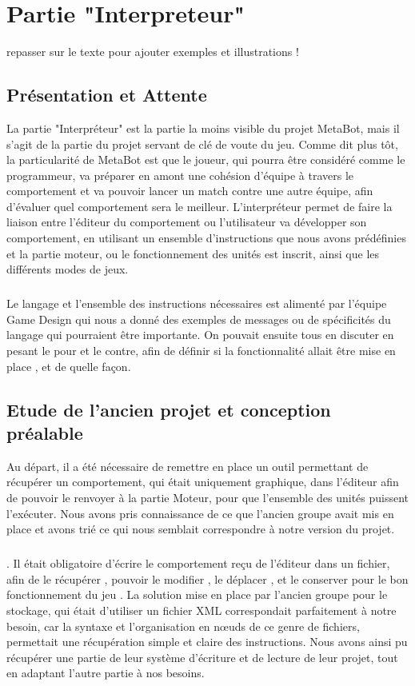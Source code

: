 \documentclass{report}
\begin{document}
\newpage
\chapter{Partie "Interpreteur"}
repasser sur le texte pour ajouter exemples et illustrations !
\section{Présentation et Attente}
La partie "Interpréteur" est la partie la moins visible du projet MetaBot,
mais il s'agit de la partie du projet servant de clé de voute du jeu.
Comme dit plus tôt, la particularité de MetaBot est que le joueur, qui pourra être considéré comme le programmeur, va préparer en amont une cohésion d'équipe à travers le comportement et va pouvoir lancer un match contre une autre équipe, afin d'évaluer quel comportement sera le meilleur.
L'interpréteur permet de faire la liaison entre l'éditeur du comportement ou l'utilisateur va développer son comportement, en utilisant un ensemble d'instructions que nous avons prédéfinies  et la partie moteur, ou le fonctionnement des unités est inscrit, ainsi que les différents modes de jeux.
\paragraph{}
Le langage et l'ensemble des instructions nécessaires est alimenté par l'équipe Game Design qui nous a donné des exemples de messages ou de spécificités du langage qui pourraient être importante. On pouvait ensuite tous en discuter en pesant le pour et le contre, afin de définir si la fonctionnalité allait être mise en place , et de quelle façon.

\section{Etude de l'ancien projet et conception préalable}

Au départ, il a été nécessaire de remettre en place un outil permettant de récupérer un comportement, qui était uniquement graphique, dans l'éditeur afin de pouvoir le renvoyer à la partie Moteur, pour que l'ensemble des unités puissent l'exécuter.
Nous avons pris connaissance de ce que l'ancien groupe avait mis en place et avons trié ce qui nous semblait correspondre à notre version du projet.
\paragraph{}
.
Il était obligatoire d'écrire le comportement reçu de l'éditeur dans un fichier, afin de le récupérer , pouvoir le modifier , le déplacer , et le conserver pour le bon fonctionnement du jeu .
La solution mise en place par l'ancien groupe pour le stockage, qui était d'utiliser un fichier XML correspondait parfaitement à notre besoin, car la syntaxe et l'organisation en nœuds de ce genre de fichiers, permettait une récupération simple et claire des instructions. Nous avons ainsi pu récupérer une partie de leur système d'écriture et de lecture de leur projet, tout en adaptant l'autre partie à nos besoins.
\end{document}
